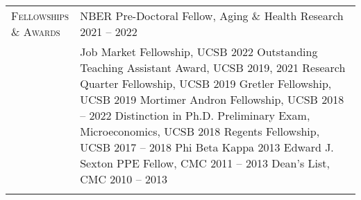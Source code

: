 \documentclass[11pt]{article}
\newcommand{\xspace}{23pt}
\begin{document}
\begin{tabularx}{\textwidth}{@{}Y Z@{}}
	\textsc{Fellowships \newline \& Awards} & 
	NBER Pre-Doctoral Fellow, Aging \& Health Research \hfill 2021 -- 2022%
	\\ \newpage & %
	Job Market Fellowship, UCSB \hfill 2022%
	\vspace{3pt} \newline
	Outstanding Teaching Assistant Award, UCSB \hfill 2019, 2021%
	\vspace{3pt} \newline
	Research Quarter Fellowship, UCSB \hfill 2019%
	\vspace{3pt} \newline
	Gretler Fellowship, UCSB \hfill 2019%
	\vspace{3pt} \newline 
	Mortimer Andron Fellowship, UCSB \hfill 2018 -- 2022%
	\vspace{3pt} \newline 
	Distinction in Ph.D. Preliminary Exam, Microeconomics, UCSB \hfill 2018%
	\vspace{3pt} \newline
	Regents Fellowship, UCSB \hfill 2017 -- 2018%
	\vspace{3pt} \newline
	Phi Beta Kappa \hfill 2013%
	\vspace{3pt} \newline
	Edward J. Sexton PPE Fellow, CMC \hfill 2011 -- 2013%
	\vspace{3pt} \newline
	Dean's List, CMC \hfill 2010 -- 2013%
	 \\ \addlinespace[\xspace]  


\end{tabularx}
\end{document}
